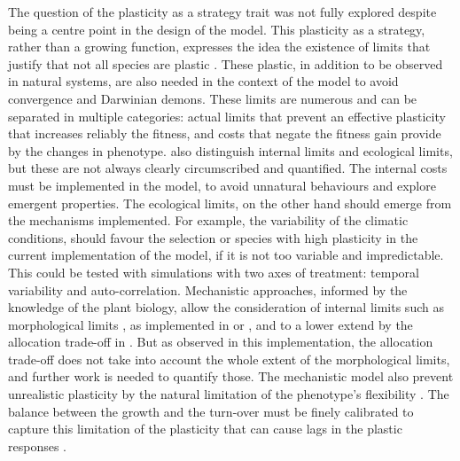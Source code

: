 The question of the plasticity as a strategy trait was not fully explored despite being a centre point in the design of the model. This plasticity as a strategy, rather than a growing function, expresses the idea the existence of limits that justify that not all species are plastic \parencite{dewitt_costs_1998 ,  van_kleunen_constraints_2005, valladares_ecological_2007, auld_re-evaluationg_2009}. These plastic, in addition to be observed in natural systems, are also needed in the context of the model to avoid convergence and Darwinian demons. These limits are numerous and can be separated in multiple categories: actual limits that prevent an effective plasticity that increases reliably the fitness, and costs that negate the fitness gain provide by the changes in phenotype.\cite{valladares_ecological_2007} also distinguish internal limits and ecological limits, but these are not always clearly circumscribed and quantified. The internal costs must be implemented in the model, to avoid unnatural behaviours and explore emergent properties. The ecological limits, on the other hand should emerge from the mechanisms implemented. For example, the variability of the climatic conditions, should favour the selection or species with high plasticity in the current implementation of the model, if it is not too variable and impredictable. This could be tested with simulations with two axes of treatment: temporal variability and auto-correlation. Mechanistic approaches, informed by the knowledge of the plant biology, allow the consideration of internal limits such as morphological limits \parencite{valladares_ecological_2007}, as implemented in \cite{maire_plasticity_2013} or \cite{lohier_analyse_2016}, and to a lower extend by the allocation trade-off in \model . But as observed in this implementation, the allocation trade-off does not take into account the whole extent of the morphological limits, and further work is needed to quantify those. The mechanistic model also prevent unrealistic plasticity by the natural limitation of the phenotype's flexibility \parencite{forsman_rethinking_2014}. The balance between the growth and the turn-over must be finely calibrated to capture this limitation of the plasticity that can cause lags in the plastic responses \parencite{dewitt_costs_1998}. %
